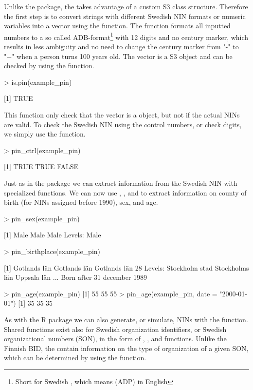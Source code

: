 Unlike the  package, the  takes advantage of a custom S3 class structure. Therefore the first step is to convert strings with different Swedish NIN formats or numeric variables into a  vector using the  function. The  function formats all inputted numbers to a so called ADB-format\footnote{Short for Swedish , which means  (ADP) in English} with 12 digits and no century marker, which results in less ambiguity and no need to change the century marker from "-" to "+" when a person turns 100 years old. The  vector is a S3 object and can be checked by using the  function.

\begin{example}
  > is.pin(example_pin)

  [1] TRUE
\end{example}

This function only check that the vector is a  object, but not if the actual NINs are valid. To check the Swedish NIN using the control numbers, or check digits, we simply use the  function.

\begin{example}
  > pin_ctrl(example_pin)

  [1]  TRUE  TRUE FALSE
\end{example}

Just as in the  package we can extract information from the Swedish NIN with specialized functions. We can now use , , and  to extract information on county of birth (for NINs assigned before 1990), sex, and age.

\begin{example}
  > pin_sex(example_pin)
   
  [1] Male Male Male
  Levels: Male

  > pin_birthplace(example_pin)
   
  [1] Gotlands län Gotlands län Gotlands län
  28 Levels: Stockholm stad Stockholms län Uppsala län ... Born after 31 december 1989

  > pin_age(example_pin)
  [1] 55 55 55
  > pin_age(example_pin, date = "2000-01-01")
  [1] 35 35 35
\end{example}

As with the  R package we can also generate, or simulate, NINs with the  function. Shared functions exist also for Swedish organization identifiers, or Swedish organizational numbers (SON), in the form of , , and  functions. Unlike the Finnish BID, the  contain information on the type of organization of a given SON, which can be determined by using the  function.

